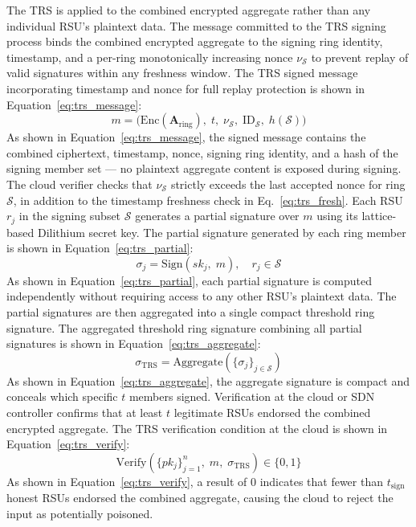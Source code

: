 \documentclass[12pt, a4paper]{report}
\begin{document}
The TRS is applied to the combined encrypted aggregate rather than any
individual RSU's plaintext data. The message committed to the TRS signing process binds the combined
encrypted aggregate to the signing ring identity, timestamp, and a
per-ring monotonically increasing nonce $\nu_{\mathcal{S}}$ to
prevent replay of valid signatures within any freshness window.
The TRS signed message incorporating timestamp and nonce for full
replay protection is shown in Equation~\eqref{eq:trs_message}:
\begin{equation}
  m = \bigl(\mathrm{Enc}(\mathbf{A}_{\mathrm{ring}}),\;
      t,\; \nu_{\mathcal{S}},\;
      \mathrm{ID}_{\mathcal{S}},\;
      h(\mathcal{S})\bigr)
  \label{eq:trs_message}
\end{equation}
As shown in Equation~\eqref{eq:trs_message}, the signed message
contains the combined ciphertext, timestamp, nonce, signing ring
identity, and a hash of the signing member set --- no plaintext
aggregate content is exposed during signing. The cloud verifier
checks that $\nu_{\mathcal{S}}$ strictly exceeds the last accepted
nonce for ring $\mathcal{S}$, in addition to the timestamp
freshness check in Eq.~\eqref{eq:trs_fresh}.
Each RSU $r_j$ in the signing subset $\mathcal{S}$ generates a partial
signature over $m$ using its lattice-based Dilithium secret key. The partial
signature generated by each ring member is shown in
Equation~\eqref{eq:trs_partial}:
\begin{equation}
  \sigma_j = \mathrm{Sign}(sk_j,\; m),
  \quad r_j \in \mathcal{S}
  \label{eq:trs_partial}
\end{equation}
As shown in Equation~\eqref{eq:trs_partial}, each partial signature is computed
independently without requiring access to any other RSU's plaintext data. The
partial signatures are then aggregated into a single compact threshold ring
signature. The aggregated threshold ring signature combining all partial
signatures is shown in Equation~\eqref{eq:trs_aggregate}:
\begin{equation}
  \sigma_{\mathrm{TRS}} =
    \mathrm{Aggregate}\!\left(\{\sigma_j\}_{j\in\mathcal{S}}\right)
  \label{eq:trs_aggregate}
\end{equation}
As shown in Equation~\eqref{eq:trs_aggregate}, the aggregate signature is
compact and conceals which specific $t$ members signed. Verification at the
cloud or SDN controller confirms that at least $t$ legitimate RSUs endorsed
the combined encrypted aggregate. The TRS verification condition at the cloud
is shown in Equation~\eqref{eq:trs_verify}:
\begin{equation}
  \mathrm{Verify}\!\left(\{pk_j\}_{j=1}^{n},\; m,\;
  \sigma_{\mathrm{TRS}}\right) \in \{0,1\}
  \label{eq:trs_verify}
\end{equation}
As shown in Equation~\eqref{eq:trs_verify}, a result of 0 indicates
that fewer than $t_{\mathrm{sign}}$ honest RSUs endorsed the combined
aggregate, causing the cloud to reject the input as potentially
poisoned.
\end{document}
